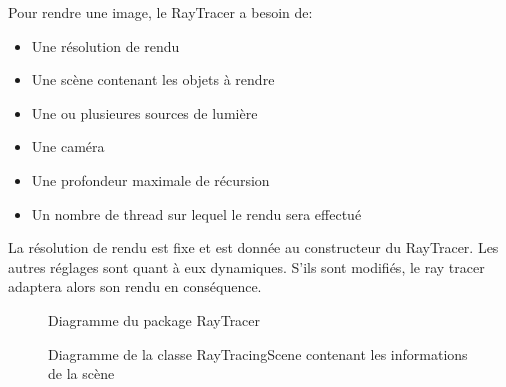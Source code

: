 \documentclass[../../Raaport RayTracer]{subfiles}
\begin{document}
Pour rendre une image, le RayTracer a besoin de:
\begin{itemize}
	\item{Une résolution de rendu}
	\item{Une scène contenant les objets à rendre}
	\item{Une ou plusieures sources de lumière}
	\item{Une caméra}
	\item{Une profondeur maximale de récursion}
	\item{Un nombre de thread sur lequel le rendu sera effectué}
\end{itemize}
La résolution de rendu est fixe et est donnée au constructeur du RayTracer. Les autres réglages sont quant à eux dynamiques. S'ils sont modifiés, le ray tracer adaptera alors son rendu en conséquence.

\begin{figure}[h!]
	
	\caption{Diagramme du package RayTracer}
	\label{diagrammeRayTracer}
\end{figure}
\FloatBarrier

\begin{figure}[h!]
	
	\caption{Diagramme de la classe RayTracingScene contenant les informations de la scène}
	\label{diagrammeRayTracingScene}
\end{figure}
\FloatBarrier
\end{document}
